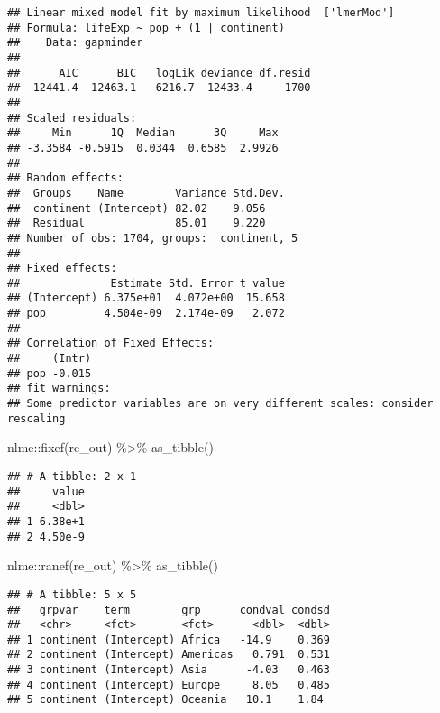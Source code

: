 \documentclass[
]{book}
\newenvironment{Shaded}{\begin{snugshade}}{\end{snugshade}}
\newcommand{\FunctionTok}[1]{\textcolor[rgb]{0.00,0.00,0.00}{#1}}
\newcommand{\NormalTok}[1]{#1}
\newcommand{\SpecialCharTok}[1]{\textcolor[rgb]{0.00,0.00,0.00}{#1}}
\begin{document}
\begin{verbatim}
## Linear mixed model fit by maximum likelihood  ['lmerMod']
## Formula: lifeExp ~ pop + (1 | continent)
##    Data: gapminder
## 
##      AIC      BIC   logLik deviance df.resid 
##  12441.4  12463.1  -6216.7  12433.4     1700 
## 
## Scaled residuals: 
##     Min      1Q  Median      3Q     Max 
## -3.3584 -0.5915  0.0344  0.6585  2.9926 
## 
## Random effects:
##  Groups    Name        Variance Std.Dev.
##  continent (Intercept) 82.02    9.056   
##  Residual              85.01    9.220   
## Number of obs: 1704, groups:  continent, 5
## 
## Fixed effects:
##              Estimate Std. Error t value
## (Intercept) 6.375e+01  4.072e+00  15.658
## pop         4.504e-09  2.174e-09   2.072
## 
## Correlation of Fixed Effects:
##     (Intr)
## pop -0.015
## fit warnings:
## Some predictor variables are on very different scales: consider rescaling
\end{verbatim}

\begin{Shaded}
\begin{Highlighting}[]
\NormalTok{nlme}\SpecialCharTok{::}\FunctionTok{fixef}\NormalTok{(re\_out) }\SpecialCharTok{\%\textgreater{}\%} \FunctionTok{as\_tibble}\NormalTok{()}
\end{Highlighting}
\end{Shaded}

\begin{verbatim}
## # A tibble: 2 x 1
##     value
##     <dbl>
## 1 6.38e+1
## 2 4.50e-9
\end{verbatim}

\begin{Shaded}
\begin{Highlighting}[]
\NormalTok{nlme}\SpecialCharTok{::}\FunctionTok{ranef}\NormalTok{(re\_out) }\SpecialCharTok{\%\textgreater{}\%} \FunctionTok{as\_tibble}\NormalTok{()}
\end{Highlighting}
\end{Shaded}

\begin{verbatim}
## # A tibble: 5 x 5
##   grpvar    term        grp      condval condsd
##   <chr>     <fct>       <fct>      <dbl>  <dbl>
## 1 continent (Intercept) Africa   -14.9    0.369
## 2 continent (Intercept) Americas   0.791  0.531
## 3 continent (Intercept) Asia      -4.03   0.463
## 4 continent (Intercept) Europe     8.05   0.485
## 5 continent (Intercept) Oceania   10.1    1.84
\end{verbatim}
\end{document}
